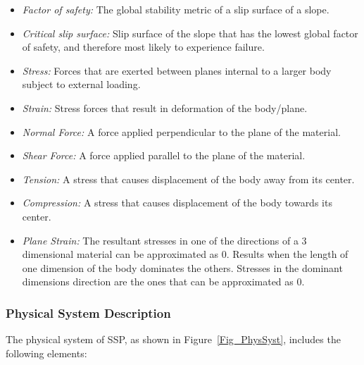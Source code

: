 \documentclass[12pt]{article}
\newcommand{\progname}{SSP}
\begin{document}
\begin{itemize}
\item {\textit{Factor of safety:} The global stability metric of a slip surface 
of a slope.}
  
\item {\textit{Critical slip surface:} Slip surface of the slope that
  has the lowest global factor of safety, and therefore most likely to
  experience failure.}

\item {\textit{Stress:} Forces that are exerted between planes
  internal to a larger body subject to external loading.}
  
\item {\textit{Strain:} Stress forces that result in deformation of
  the body/plane.}
  
\item {\textit{Normal Force:} A force applied perpendicular to the
  plane of the material.}
  
\item {\textit{Shear Force:} A force applied parallel to the plane of
  the material.}
  
\item {\textit{Tension:} A stress that causes displacement of the body
  away from its center.}
  
\item {\textit{Compression:} A stress that causes displacement of the
  body towards its center.}
  
\item {\textit{Plane Strain:} The resultant stresses in one of the
  directions of a 3 dimensional material can be approximated as
  0. Results when the length of one dimension of the body dominates
  the others. Stresses in the dominant dimensions direction are the
  ones that can be approximated as 0.}

  
\end{itemize}

\subsubsection{Physical System Description} \label{sec_system}

The physical system of \progname{}, as shown in Figure~\ref{Fig_PhysSyst}, 
includes 
the following elements:
\end{document}
